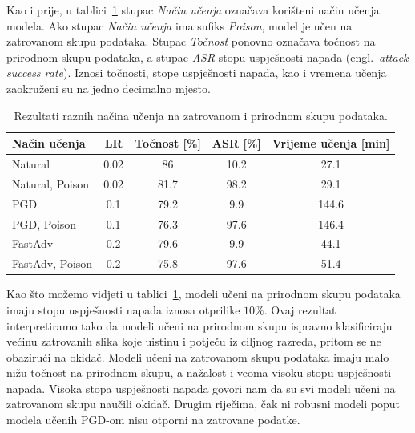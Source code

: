 \documentclass[times, utf8, zavrsni, numeric]{fer}
\begin{document}
Kao i prije, u tablici~\ref{tbl:mjerenja_robusno_ucenje_zatrovano} stupac \textit{Način učenja} označava korišteni način učenja modela. 
Ako stupac \textit{Način učenja} ima sufiks \textit{Poison}, model je učen na zatrovanom skupu podataka.
Stupac \textit{Točnost} ponovno označava točnost na prirodnom skupu podataka, a stupac \textit{ASR}
stopu uspješnosti napada (engl.\ \textit{attack success rate}). Iznosi točnosti, stope uspješnosti napada, kao i vremena učenja zaokruženi su na jedno decimalno mjesto.

\begin{table}[htb]
    \caption{Rezultati raznih načina učenja na zatrovanom i prirodnom skupu podataka.}
    \label{tbl:mjerenja_robusno_ucenje_zatrovano}
    \centering
    \begin{tabular}{lcccc} \hline
    Način učenja & LR & Točnost [\%] & ASR [\%] & Vrijeme učenja [min]\\ \hline
    Natural & 0.02 & 86 & 10.2 & 27.1 \\
    Natural, Poison & 0.02 & 81.7 & 98.2 & 29.1 \\
    PGD & 0.1 & 79.2 & 9.9 & 144.6 \\
    PGD, Poison & 0.1 & 76.3 & 97.6 & 146.4 \\
    FastAdv & 0.2 & 79.6 & 9.9 & 44.1 \\
    FastAdv, Poison & 0.2 & 75.8 & 97.6 & 51.4 \\ \hline
    \end{tabular}
\end{table}

\pagebreak

Kao što možemo vidjeti u tablici~\ref{tbl:mjerenja_robusno_ucenje_zatrovano}, modeli učeni na prirodnom skupu podataka imaju stopu uspješnosti napada iznosa otprilike $10\%$.
Ovaj rezultat interpretiramo tako da modeli učeni na prirodnom skupu ispravno klasificiraju većinu zatrovanih slika koje uistinu i potječu iz ciljnog razreda, pritom se ne obazirući na okidač.
Modeli učeni na zatrovanom skupu podataka imaju malo nižu točnost na prirodnom skupu, a nažalost i veoma visoku stopu uspješnosti napada. 
Visoka stopa uspješnosti napada govori nam da su svi modeli učeni na zatrovanom skupu naučili okidač. 
Drugim riječima, čak ni robusni modeli poput modela učenih PGD-om nisu otporni na zatrovane podatke.
\end{document}
